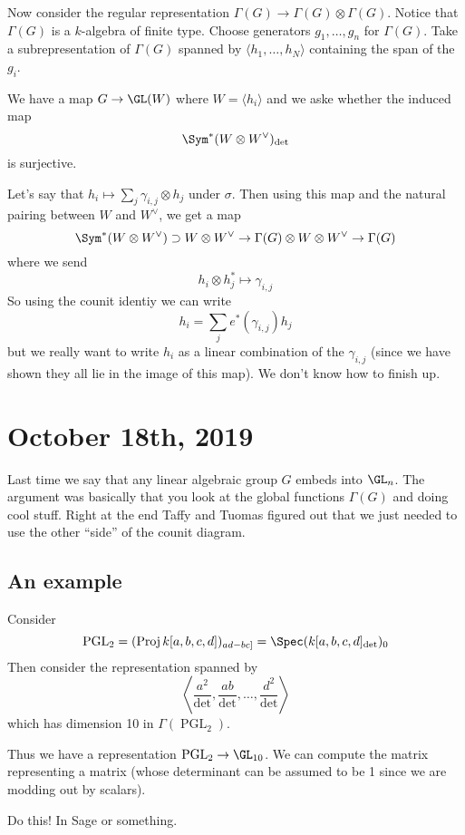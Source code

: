 \documentclass[12pt]{article}
\begin{document}
Now consider the regular representation $\Gamma(G)\to \Gamma(G)\otimes \Gamma(G)$. Notice that $\Gamma(G)$ is 
a $k$-algebra of finite type. Choose generators $g_1,\dots,g_n$ for $\Gamma(G)$. Take a subrepresentation of $\Gamma(G)$
spanned by $\langle h_1,\dots,h_N\rangle$ containing the span of the $g_i$.

We have a map $G\to \GL(W)$ where $W=\langle h_i\rangle$ and we aske whether the induced map 
\[\Sym^\ast(W\otimes W^\vee)_{\det}\]
is surjective.

Let's say that $h_i\mapsto \sum_j\gamma_{i,j}\otimes h_j$ under $\sigma$. Then using this map and the natural pairing between $W$ and $W^\vee$, we get a map 
\[\Sym^\ast(W\otimes W^\vee)\supset W\otimes W^\vee\to\Gamma(G)\otimes W\otimes W^\vee\to \Gamma(G)\]
where we send 
\[h_i\otimes h_j^\ast\mapsto \gamma_{i,j}\]
So using the counit identiy we can write 
\[h_i=\sum_j e^\ast(\gamma_{i,j})h_j\]
but we really want to write $h_i$ as a linear combination of the $\gamma_{i,j}$ (since we have shown they all lie in the image of this map).
We don't know how to finish up.

\section{October 18th, 2019}
Last time we say that any linear algebraic group $G$ embeds into $\GL_n$. The argument was basically that you look at the global functions 
$\Gamma(G)$ and doing cool stuff. Right at the end Taffy and Tuomas figured out that we just needed to use the other ``side'' of the counit diagram.

\subsection{An example}
Consider 
\[\operatorname{PGL}_2=(\operatorname{Proj} k[a,b,c,d])_{ad-bc]}=\Spec(k[a,b,c,d]_{\det})_0\]
Then consider the representation spanned by 
\[\left\langle\frac{a^2}{\det},\frac{ab}{\det},\dots,\frac{d^2}{\det}\right\rangle\]
which has dimension 10 in $\Gamma(\operatorname{PGL}_2)$.

Thus we have a representation $\operatorname{PGL}_2\to\GL_{10}$. We can compute the matrix representing a matrix (whose determinant
can be assumed to be 1 since we are modding out by scalars).
\begin{prob}
	Do this! In Sage or something.
\end{prob}
\end{document}

